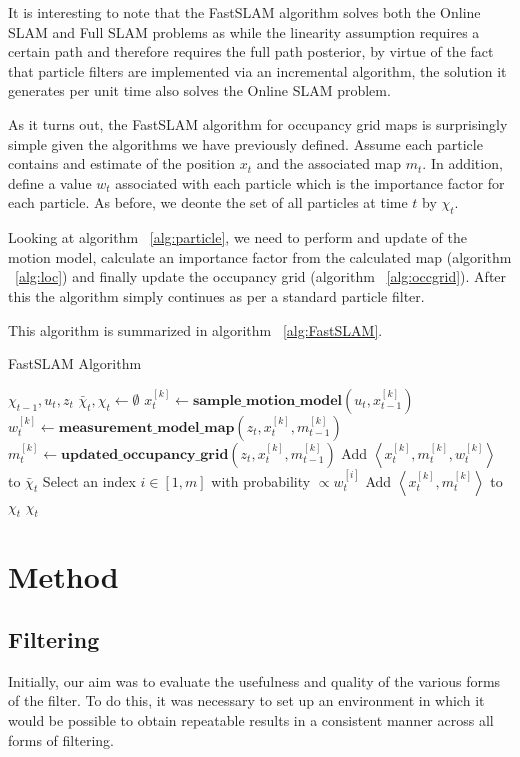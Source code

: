 \documentclass[english]{article}
\begin{document}
It is interesting to note that the FastSLAM algorithm solves both the Online SLAM and Full SLAM problems as while the linearity assumption requires a certain path and therefore requires the full path posterior, by virtue of the fact that particle filters are implemented via an incremental algorithm, the solution it generates per unit time also solves the Online SLAM problem.

As it turns out, the FastSLAM algorithm for occupancy grid maps is surprisingly simple given the algorithms we have previously defined. Assume each particle contains and estimate of the position $x_t$ and the associated map $m_t$. In addition, define a value $w_t$ associated with each particle which is the importance factor for each particle. As before, we deonte the set of all particles at time $t$ by $\chi_{t}$.

Looking at algorithm ~\ref{alg:particle}, we need to perform and update of the motion model, calculate an importance factor from the calculated map (algorithm ~\ref{alg:loc}) and finally update the occupancy grid (algorithm ~\ref{alg:occgrid}). After this the algorithm simply continues as per a standard particle filter.

This algorithm is summarized in algorithm ~\ref{alg:FastSLAM}.

\begin{algorithm}
\caption{FastSLAM Algorithm}
\label{alg:FastSLAM}
\begin{algorithmic}
	\REQUIRE $\chi_{t-1}, u_t, z_t$
	\STATE $\bar{\chi}_t, \chi_t \leftarrow \emptyset$
	\STATE $x_t^{[k]} \leftarrow \textbf{sample\_motion\_model}(u_t, x_{t-1}^{[k]})$
	\STATE $w_t^{[k]} \leftarrow \textbf{measurement\_model\_map}(z_t, x_t^{[k]}, m_{t-1}^{[k]})$
	\STATE $m_t^{[k]} \leftarrow \textbf{updated\_occupancy\_grid}(z_t, x_t^{[k]}, m_{t-1}^{[k]})$
	\STATE Add $\left\langle x_t^{[k]}, m_t^{[k]}, w_t^{[k]} \right\rangle$ to $\bar{\chi}_t$
	\ENDFOR
	\STATE Select an index $i \in [1,m]$ with probability $\propto w_t^{[i]}$
	\STATE Add $\left\langle x_t^{[k]}, m_t^{[k]} \right\rangle$ to $\chi_t$
	\ENDFOR
	\RETURN $\chi_t$


\end{algorithmic}
\end{algorithm}

\section{Method}
\subsection{Filtering}
Initially, our aim was to evaluate the usefulness and quality of the various forms of the filter. To do this, it was necessary to set up an environment in which it would be possible to obtain repeatable results in a consistent manner across all forms of filtering.
\end{document}
